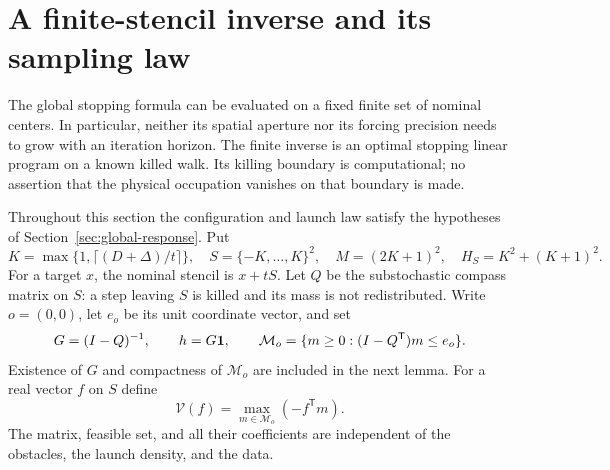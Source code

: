 \section{A finite-stencil inverse and its sampling law}
\label{sec:finite-stencil}
The global stopping formula can be evaluated on a fixed finite set of
nominal centers. In particular, neither its spatial aperture nor its
forcing precision needs to grow with an iteration horizon. The finite
inverse is an optimal stopping linear program on a known killed walk.
Its killing boundary is computational; no assertion that the physical
occupation vanishes on that boundary is made.

Throughout this section the configuration and launch law satisfy the
hypotheses of Section~\ref{sec:global-response}. Put
\begin{equation}\label{eq:stencil-constants}
 K=\max\{1,\lceil(D+\Delta)/t\rceil\},\quad
 S=\{-K,\ldots,K\}^2,\quad M=(2K+1)^2,\quad
 H_S=K^2+(K+1)^2.
\end{equation}
For a target $x$, the nominal stencil is $x+tS$. Let $Q$ be the
substochastic compass matrix on $S$: a step leaving $S$ is killed and
its mass is not redistributed. Write $o=(0,0)$, let $e_o$ be its unit
coordinate vector, and set
\begin{equation}\label{eq:stencil-green}
 G=(I-Q)^{-1},\qquad h=G\mathbf 1,\qquad
 \mathcal M_o=\{m\ge0:(I-Q^{\mathsf T})m\le e_o\}.
\end{equation}
Existence of $G$ and compactness of $\mathcal M_o$ are included in the
next lemma. For a real vector $f$ on $S$ define
\begin{equation}\label{eq:stencil-functional}
 \mathcal V(f)=\max_{m\in\mathcal M_o}(-f^{\mathsf T}m).
\end{equation}
The matrix, feasible set, and all their coefficients are independent
of the obstacles, the launch density, and the data.

